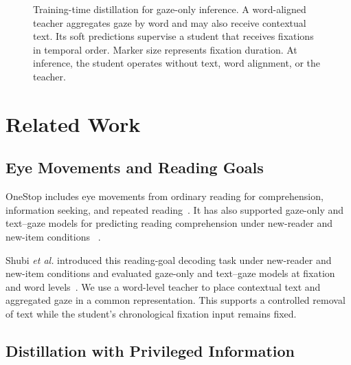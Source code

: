 \documentclass[conference,letterpaper]{IEEEtran}
\begin{document}
\begin{figure}[t]
\caption{Training-time distillation for gaze-only inference.  A word-aligned
teacher aggregates gaze by word and may also receive contextual text.  Its
soft predictions supervise a student that receives fixations in temporal
order.  Marker size represents fixation duration.  At inference, the student
operates without text, word alignment, or the teacher.}
\label{fig:overview}
\end{figure}

\section{Related Work}

\subsection{Eye Movements and Reading Goals}

OneStop includes eye movements from ordinary reading for comprehension,
information seeking, and repeated reading~\cite{berzak2025onestop}.  It has
also supported gaze-only and text--gaze models for predicting reading
comprehension under new-reader and new-item conditions
~\cite{shubi2024comprehension}.

Shubi \emph{et al.} introduced this reading-goal decoding task under new-reader
and new-item conditions and evaluated gaze-only and text--gaze models at
fixation and word levels~\cite{shubi2025decoding}.  We use a word-level teacher
to place contextual text and aggregated gaze in a common representation.  This
supports a controlled removal of text while the student's chronological
fixation input remains fixed.

\subsection{Distillation with Privileged Information}
\end{document}
